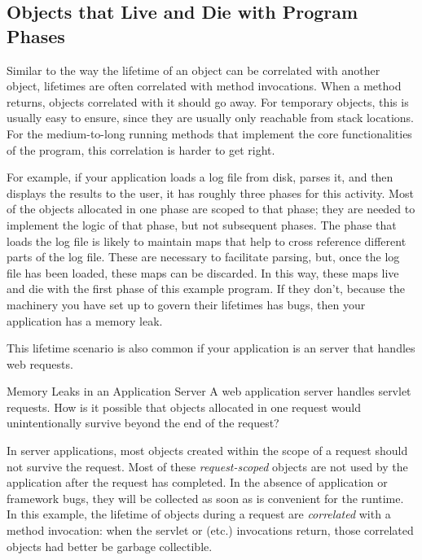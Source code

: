 \subsection{Objects that Live and Die with Program Phases}
\label{correlated-lifetime-2}

Similar to the way the lifetime of an object can be correlated with another
object, lifetimes are often correlated with method invocations. When a method
returns, objects correlated with it should go away. For temporary objects, this
is usually easy to ensure, since they are usually only reachable from stack
locations. For the medium-to-long running methods that implement the
core functionalities of the program, this correlation is harder to get right.

For example, if your application loads a log file from disk,
parses it, and then displays the results to the user, it has roughly three
phases for this activity. Most of the objects allocated in one phase are scoped to that
phase; they are needed to implement the logic of that phase, but not subsequent
phases. The phase that loads the log file is likely to maintain maps that
help to cross reference different parts of the log file. These are necessary
to facilitate parsing, but, once the log file has been loaded, these maps can be
discarded. In this way, these maps live and die with the first phase of this
example program. If they don't, because the machinery you have set up to
govern their lifetimes has bugs, then your application has a memory
leak.

This lifetime scenario is also common if your application is an
server that handles web requests.

\begin{example}{Memory Leaks in an Application Server}
	A web application server handles servlet requests. How is it possible that
	objects allocated in one request would unintentionally survive beyond the end
	of the request?
\end{example} 
  
In server applications, most
objects created within the scope of a request should not survive the
request. Most of these \emph{request-scoped}
 objects are not used by the application after the
request has completed. In the absence of application or framework bugs, they will
be collected as soon as is convenient for the runtime. In this example, the
lifetime of objects during a request are \emph{correlated} with a method
invocation: when the servlet  or  (etc.) invocations
return, those correlated objects had better be garbage collectible.

